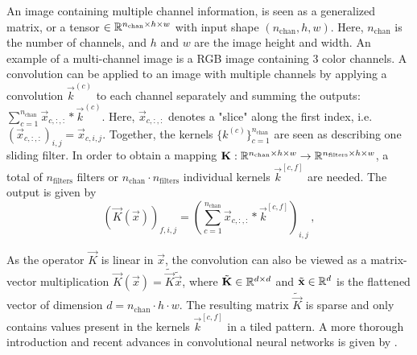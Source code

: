 An image containing multiple channel information, 
is seen as a generalized matrix, or a tensor $\in \mathbb{R}^{n_\text{chan}\times h \times w}$
with input shape $(n_\text{chan}, h , w)$.
Here, $n_\text{chan}$ is the number of channels, and $h$ and $w$ are the image height and width.
An example of a multi-channel image is a RGB image containing 3 color channels.
A convolution can be applied to an image with multiple channels by applying a convolution
$\vec k ^{(c)}$ to each channel separately and summing the outputs:
$\sum_{c=1}^{n_\text{chan}} \vec x_{c,:,:} * \vec k ^{(c)}$.
Here, $\vec x_{c,:,:}$ denotes a "slice" along the first index, i.e. $(\vec x_{c,:,:})_{i,j} = \vec x_{c,i,j}$.
Together, the kernels $\{k^{(c)}\}_{c=1}^{n_\text{chan}}$ are seen as describing one sliding filter.
In order to obtain a mapping
$\mathbf K:\mathbb{R}^{n_\text{chan}\times h \times w} \to \mathbb{R}^{n_\text{filters}\times h \times w}$,
a total of $n_\text{filters}$ filters or $n_\text{chan} \cdot n_\text{filters}$ 
individual kernels $\vec k^{[c,f]}$ are needed.
The output is given by
\begin{equation}
\label{eqn:convolution_operator}   
    (\vec K (\vec x))_{f,i,j}
    = \left (\sum_{c=1}^{n_\text{chan}} \vec x_{c,:,:} * \vec k^{[c,f]} \right )_{i,j} \,,
\end{equation}

As the operator $\vec K$ is linear in $\vec x$, the convolution can also be viewed as a matrix-vector multiplication
$\vec K(\vec x) = \tilde {\vec K} \tilde {\vec x}$, where $\tilde {\mathbf K} \in \mathbb{R}^{d\times d}$ and 
$\tilde {\mathbf x} \in \mathbb{R}^d$ is the flattened vector of dimension $d=n_\text{chan}\cdot h \cdot w$.
The resulting matrix $\tilde {\vec K}$ is sparse and only contains values present in the kernels $\vec k^{[c,f]}$
in a tiled pattern.
A more thorough introduction and recent advances in convolutional neural networks is given by \cite{Convnet_advances}.